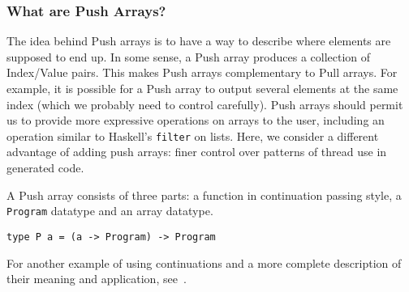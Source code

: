 




\subsubsection {What are Push Arrays?} 

The idea behind Push arrays is to have a way to describe where 
elements are supposed to end up. In some sense, a Push array produces 
a collection of Index/Value pairs. %
This makes Push arrays complementary to Pull arrays. For example, it 
is possible for a Push array to output several elements at the same index 
(which we probably need to control carefully). Push arrays should permit 
us to provide more expressive operations on arrays to the user, including 
an operation similar to Haskell's {\tt filter} on lists. Here, we consider 
a different advantage of adding push arrays: finer control over patterns of 
thread use in generated code.



A Push array consists of three parts: a function in continuation passing style, 
a {\tt Program} datatype and an array datatype. 

\begin{codesize}
\begin{verbatim}
type P a = (a -> Program) -> Program 
\end{verbatim}
\end{codesize}

\noindent
For another example of using continuations and a more complete
description of their meaning and application, see~\cite{POORKOEN}. 

